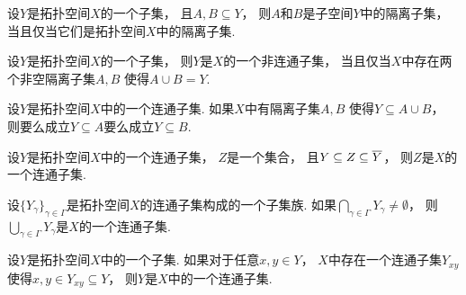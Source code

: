 \begin{theorem}
设\(Y\)是拓扑空间\(X\)的一个子集，
且\(A,B \subseteq Y\)，
则\(A\)和\(B\)是子空间\(Y\)中的隔离子集，
当且仅当它们是拓扑空间\(X\)中的隔离子集.
\end{theorem}

\begin{corollary}
设\(Y\)是拓扑空间\(X\)的一个子集，
则\(Y\)是\(X\)的一个非连通子集，
当且仅当\(X\)中存在两个非空隔离子集\(A,B\)
使得\(A \cup B = Y\).
\end{corollary}

\begin{theorem}
设\(Y\)是拓扑空间\(X\)中的一个连通子集.
如果\(X\)中有隔离子集\(A,B\)
使得\(Y \subseteq A \cup B\)，
则要么成立\(Y \subseteq A\)要么成立\(Y \subseteq B\).
\end{theorem}

\begin{theorem}
设\(Y\)是拓扑空间\(X\)中的一个连通子集，
\(Z\)是一个集合，
且\(Y \subseteq Z \subseteq \overline{Y}\)，
则\(Z\)是\(X\)的一个连通子集.
\end{theorem}

\begin{theorem}
设\(\{Y_\gamma\}_{\gamma \in \Gamma}\)是拓扑空间\(X\)的连通子集构成的一个子集族.
如果\(\bigcap_{\gamma \in \Gamma} Y_\gamma \neq \emptyset\)，
则\(\bigcup_{\gamma \in \Gamma} Y_\gamma\)是\(X\)的一个连通子集.
\end{theorem}

\begin{theorem}
设\(Y\)是拓扑空间\(X\)中的一个子集.
如果对于任意\(x,y \in Y\)，
\(X\)中存在一个连通子集\(Y_{xy}\)
使得\(x,y \in Y_{xy} \subseteq Y\)，
则\(Y\)是\(X\)中的一个连通子集.
\end{theorem}
